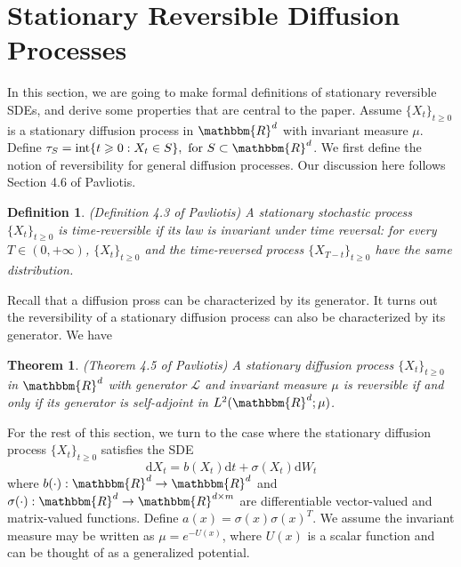 \documentclass[english, aip, jcp, priprint, graphicx,floatfix]{revtex4-1}
\newtheorem{definition}{Definition}
\newtheorem{theorem}{Theorem}
\theoremstyle{plain}
\theoremstyle{definition}
\theoremstyle{plain}
\begin{document}
\appendix

\section{Stationary Reversible Diffusion Processes}\label{sec:reversible_diffusion}

In this section, we are going to make formal definitions of stationary
reversible SDEs, and derive some properties that are central to the paper.
Assume $\{X_t\}_{t \geqslant 0}$ is a stationary diffusion process in
$\mathbbm{R}^d$ with invariant measure ${\mu}$. Define $\tau_S
=\ensuremath{\operatorname{int}} \{ t \geqslant 0 : X_t \in S \} , \text{ for
} S \subset \mathbbm{R}^d$. We first define the notion of reversibility for
general diffusion processes. Our discussion here follows Section 4.6 of
Pavliotis\cite{Pavliotis2016-xn}.

\begin{definition}
(Definition 4.3 of Pavliotis\cite{Pavliotis2016-xn}) A stationary stochastic
process $\{X_t\}_{t \geqslant 0}$ is time-reversible if its law is invariant under time
reversal: for every $T \in (0, + \infty)$, $\{X_t\}_{t \geqslant 0}$ and the time-reversed
process $\{X_{T - t}\}_{t \geqslant 0}$ have the same distribution.
\end{definition}

Recall that a diffusion pross can be characterized by its generator. It turns
out the reversibility of a stationary diffusion process can also be
characterized by its generator. We have

\begin{theorem}
\label{thm:reversibility}(Theorem 4.5 of Pavliotis\cite{Pavliotis2016-xn}) A
stationary diffusion process $\{X_t\}_{t \geqslant 0}$ in $\mathbbm{R}^d$ with generator
$\mathcal{L}$ and invariant measure ${\mu}$ is reversible if and only if
its generator is self-adjoint in $L^2 (\mathbbm{R}^d ; {\mu})$.
\end{theorem}

For the rest of this section, we turn to the case where the stationary
diffusion process $\{X_t\}_{t \geqslant 0}$ satisfies the SDE
\[ \mathrm{d} X_t = b (X_t) \mathrm{d} t + \sigma (X_t) \mathrm{d} W_t \]
where $b (\cdot) : \mathbbm{R}^d \rightarrow \mathbbm{R}^d$ and $\sigma
(\cdot) : \mathbbm{R}^d \rightarrow \mathbbm{R}^{d \times m}$ are
differentiable vector-valued and matrix-valued functions. Define $a (x) =
\sigma (x) \sigma (x)^T$. We assume the invariant measure may be written as
${\mu}= e^{- U (x)}$, where $U (x)$ is a scalar function and can be
thought of as a generalized potential.
\end{document}
